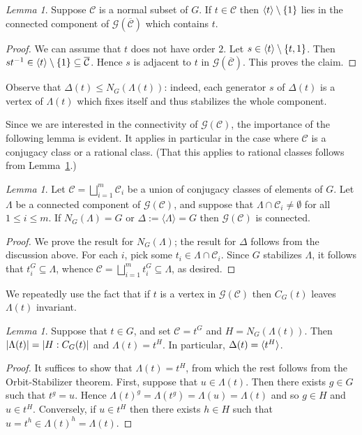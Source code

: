 \documentclass[11pt,a4paper]{amsart}
\theoremstyle{plain}
\theoremstyle{definition}
\theoremstyle{remark}
\newtheorem{lemma}[definition]{Lemma}
\newcounter{claim}[definition]
\theoremstyle{remark}
\theoremstyle{remark}
\theoremstyle{definition}
\newcommand{\GG}{\mathcal{G}}
\DeclarePairedDelimiter{\gen}{\langle}{\rangle}
\begin{document}
\begin{lemma}\label{lem:rat1} Suppose $\mathcal C$ is a normal subset of $G$. If $t \in \mathcal C$ then $\gen{t}\setminus \{1\}$ lies in the connected component of $\GG(\overline{\mathcal C})$ which contains $t$.
\end{lemma}

\begin{proof} We can assume that $t$ does not have order $2$. Let $s \in \gen{t}\setminus \{t,1\}$. Then $st^{-1} \in \gen{t}\setminus \{1\} \subseteq \overline{\mathcal C}$. Hence $s$ is adjacent to $t$ in $\GG(\overline{\mathcal C})$. This proves the claim.\end{proof}

Observe that $\Delta(t)\leq N_G(\Lambda(t))$: indeed, each generator $s$ of $\Delta(t)$ is a vertex of $\Lambda(t)$ which fixes itself and thus stabilizes the whole component.

Since we are interested in the connectivity of $\GG(\mathcal C)$, the importance of the following lemma is evident. It applies in particular in the case where $\mathcal C$ is a conjugacy class or a rational class. (That this applies to rational classes follows from Lemma~\ref{lem:rat1}.)

\begin{lemma}\label{lem:connectedstabilizer} Let $\mathcal C=\bigsqcup_{i=1}^m\mathcal{C}_i$ be a union of conjugacy classes of elements of $G$. Let $\Lambda$ be a connected component of $\GG(\mathcal C)$, and suppose that $\Lambda\cap\mathcal{C}_i\ne\emptyset$ for all $1\leq i\leq m$. If $N_G(\Lambda)=G$ or $\Delta:=\langle\Lambda\rangle=G$ then $\GG(\mathcal C)$ is connected.
\end{lemma}
\begin{proof} We prove the result for $N_G(\Lambda)$; the result for $\Delta$ follows from the discussion above. For each $i$, pick some $t_i\in\Lambda\cap\mathcal{C}_i$. Since $G$ stabilizes $\Lambda$, it follows that $t_i^G \subseteq \Lambda$, whence $\mathcal{C}=\bigsqcup_{i=1}^mt_i^G\subseteq \Lambda$, as desired.
\end{proof}

We repeatedly use the fact that if $t$ is a vertex in $\GG(\mathcal C)$ then $C_G(t)$ leaves $\Lambda(t)$ invariant.

\begin{lemma}\label{lem:componentgroup} Suppose that $t\in G$, and set $\mathcal C=t^G$ and $H=N_G(\Lambda(t))$. Then $|\Lambda(t)|={\nolinebreak|H:C_G(t)|}$ and $\Lambda(t)=t^{H}$. In particular, $\Delta(t)=\gen{t^H}$.
\end{lemma}
\begin{proof}
It suffices to show that $\Lambda(t)=t^H$, from which the rest follows from the Orbit-Stabilizer theorem. First, suppose that $u\in \Lambda(t)$. Then there exists $g\in G$ such that $t^g=u$. Hence $\Lambda(t)^g=\Lambda(t^g)= \Lambda(u)= \Lambda(t)$ and so $g\in H$ and $u\in t^H$. Conversely, if $u\in t^H$ then there exists $h\in H$ such that $u=t^h\in \Lambda(t)^h=\Lambda(t)$.
\end{proof}
\end{document}

